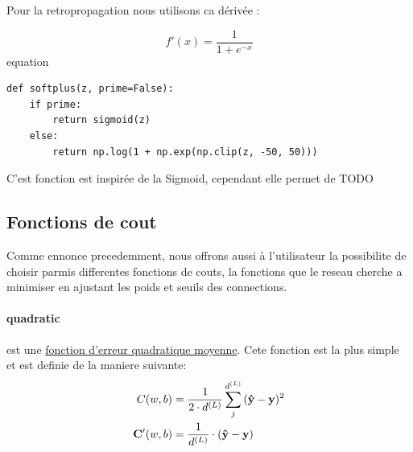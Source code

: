 \documentclass[11pt]{article}
\begin{document}
Pour la retropropagation nous utilisons ca d\'eriv\'ee :

\begin{equation}
		f'(x)=\frac{1}{1+e^{-x}}
\end{equation}equation

\begin{lstlisting}
def softplus(z, prime=False):
	if prime:
		return sigmoid(z)
	else:
		return np.log(1 + np.exp(np.clip(z, -50, 50)))
\end{lstlisting}

C'est fonction est inspir\'ee de la Sigmoid, cependant elle permet de TODO




\subsection{Fonctions de cout}\label{cost}
Comme ennonce precedemment, nous offrons aussi \`a l'utilisateur la possibilite
de choisir parmis differentes fonctions de couts, la fonctions que le reseau
cherche a minimiser en ajustant les poids et seuils des connections.
\paragraph{quadratic} est une
\href{https://fr.wikipedia.org/wiki/Erreur_quadratique_moyenne}
{fonction d'erreur quadratique moyenne}. Cete fonction est la plus simple et
est definie de la maniere suivante:
\begin{equation}
	\begin{aligned}
		C(w, b) &= \frac{1}{2\cdot d^{(L)}}\sum_{j}^{d^{(L)}}{({\bf\hat y} - {\bf y})^2}  \\
		{\bf C'}(w, b) &= \frac{1}{d^{(L)}}\cdot({\bf\hat y} - {\bf y})
	\end{aligned}
\end{equation}
\end{document}
